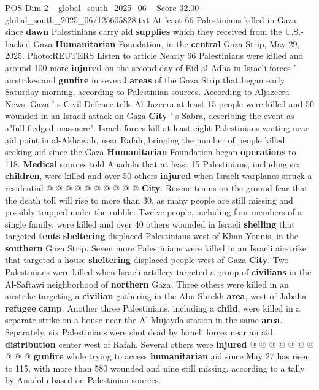 \begin{textsample}{POS Dim 2 – global\_south\_2025\_06 – Score 32.00 – global\_south\_2025\_06/125605828.txt}  \label{ex:f2_pos_083}
At least 66 Palestinians killed in Gaza since \textbf{dawn} Palestinians carry aid \textbf{supplies} which they received from the U.S.-backed Gaza \textbf{Humanitarian} Foundation, in the \textbf{central} Gaza Strip, May 29, 2025.
Photo:REUTERS Listen to article Nearly 66 Palestinians were killed and around 100 more \textbf{injured} on the second day of Eid al-Adha in Israeli forces ' airstrikes and \textbf{gunfire} in several \textbf{areas} of the Gaza Strip that began early Saturday morning, according to Palestinian sources.
According to Aljazeera News, Gaza ' s Civil Defence tells Al Jazeera at least 15 people were killed and 50 wounded in an Israeli attack on Gaza \textbf{City} ' s Sabra, describing the event as a"full-fledged massacre".
Israeli forces kill at least eight Palestinians waiting near aid point in al-Akhawah, near Rafah, bringing the number of people killed seeking aid since the Gaza \textbf{Humanitarian} Foundation began \textbf{operations} to 118. \textbf{Medical} sources told Anadolu that at least 15 Palestinians, including six \textbf{children}, were killed and over 50 others \textbf{injured} when Israeli warplanes struck a residential @ @ @ @ @ @ @ @ @ @ \textbf{City}.
Rescue teams on the ground fear that the death toll will rise to more than 30, as many people are still missing and possibly trapped under the rubble.
Twelve people, including four members of a single family, were killed and over 40 others wounded in Israeli \textbf{shelling} that targeted \textbf{tents} \textbf{sheltering} displaced Palestinians west of Khan Younis, in the \textbf{southern} Gaza Strip.
Seven more Palestinians were killed in an Israeli airstrike that targeted a house \textbf{sheltering} displaced people west of Gaza \textbf{City}.
Two Palestinians were killed when Israeli artillery targeted a group of \textbf{civilians} in the Al-Saftawi neighborhood of \textbf{northern} Gaza.
Three others were killed in an airstrike targeting a \textbf{civilian} gathering in the Abu Shrekh \textbf{area}, west of Jabalia \textbf{refugee} \textbf{camp}.
Another three Palestinians, including a \textbf{child}, were killed in a separate strike on a house near the Al-Mujayda station in the same \textbf{area}.
Separately, six Palestinians were shot dead by Israeli forces near an aid \textbf{distribution} center west of Rafah.
Several others were \textbf{injured} @ @ @ @ @ @ @ @ @ @ \textbf{gunfire} while trying to access \textbf{humanitarian} aid since May 27 has risen to 115, with more than 580 wounded and nine still missing, according to a tally by Anadolu based on Palestinian sources.

\end{textsample}

